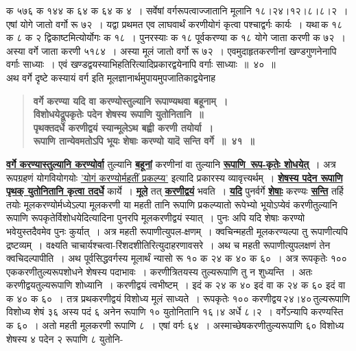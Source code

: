 \documentclass[11pt, openany]{book}
\begin{document}
\newpage

\begin{sloppypar}
\noindent क ५७६ क १४४ क ६४ क ६४ क ४~। सर्वेषां वर्गरूपत्वाज्जातानि मूलानि १८।२४।१२।८।८।२~। एषां योगे जातो वर्गो रू ७२~। यद्वा प्रथमत एव लाघवार्थं करणीयोगं कृत्वा पश्चाद्वर्गः कार्यः~। यथा\textendash \,क १८ क ८ क २ द्विकाष्टमित्योर्योगः क १८~। पुनरस्याः क १८ पूर्वकरण्या क १८ योगे जाता करणी क ७२~। अस्या वर्गे जाता करणी ५१८४~। अस्या मूलं जातो वर्गो रू ७२~। एवमुदाहृतकरणीनां खण्डगुणनेनापि वर्गाः साध्याः~। एवं खण्डद्वयस्याभिहतिरित्यादिप्रकारद्वयेनापि वर्गाः साध्याः~॥~४०~॥ \\

{\small अथ वर्गे दृष्टे कस्यायं वर्ग इति मूलज्ञानार्थमुपायमुपजातिकाद्वयेनाह\textendash }

 \label{4.41}
\begin{quote}
{\large \textbf{{\color{purple}वर्गे करण्या यदि वा करण्योस्तुल्यानि रूपाण्यथवा बहूनाम्~।\\
विशोधयेद्रूपकृतेः पदेन शेषस्य रूपाणि युतोनितानि~॥\\
पृथक्तदर्धे करणीद्वयं स्यान्मूलेऽथ बह्वी करणी तयोर्या~।\\
रूपाणि तान्येवमतोऽपि भूयः शेषाः करण्यो यादॆ सन्ति वर्गे~॥~४१~॥}}}
\end{quote}

\hyperref[4.41]{\textbf{वर्गे करण्यास्तुल्यानि करण्योर्वा}} तुल्यानि \hyperref[4.41]{\textbf{बहूनां}} करणीनां वा तुल्यानि \hyperref[4.41]{\textbf{रूपाणि~रूप-कृतेः शोधयेत्}}~। अत्र रूपग्रहणं योगवियोगयोः \hyperref[4.34]{'योगं करण्योर्महतीं प्रकल्प्य'} इत्यादि प्रकारस्य व्यावृत्त्यर्थम्~। \hyperref[4.41]{\textbf{शेषस्य पदेन रूपाणि पृथक् युतोनितानि कृत्वा तदर्धे}} कार्ये~। \hyperref[4.41]{\textbf{मूले}} तत् \hyperref[4.41]{\textbf{करणीद्वयं}} भवति~। \hyperref[4.41]{\textbf{यदि}} पुनर्वर्गे \hyperref[4.41]{\textbf{शेषाः}} करण्यः \hyperref[4.41]{\textbf{सन्ति}} तर्हि तयोः मूलकरण्योर्मध्येऽल्पा मूलकरणी या महती तानि रूपाणि प्रकल्प्यातो रूपेभ्यो भूयोऽप्येवं करणीतुल्यानि रूपाणि रूपकृतेर्विशोधयेदित्यादिना पुनरपि मूलकरणीद्वयं स्यात्~। पुनः अपि यदि शेषाः करण्यो भवेयुस्तदैवमेव पुनः कुर्यात्~। अत्र महती रूपाणीत्युपल-क्षणम्~। क्वचिन्महती मूलकरण्यल्पा तु रूपाणीत्यपि द्रष्टव्यम्~। वक्ष्यति चाचार्यश्चत्वा-रिंशदशीतिरित्युदाहरणावसरे~। अथ च महती रूपाणीत्युपलक्षणं तेन क्वचिदल्पापीति~। अथ पूर्वसिद्धवर्गस्य मूलार्थं न्यासो रू १० क २४ क ४० क ६०~। अत्र रूपकृतेः १०० एककरणीतुल्यरूपशोधने शेषस्य पदाभावः~। करणीत्रितयस्य तुल्यरूपाणि तु न शुध्यन्ति~। अतः करणीद्वयतुल्यरूपाणि शोध्यानि~। करणीद्वयं त्वभीष्टम्~। इदं क २४ क ४० इदं वा क २४ क ६० इदं वा क ४० क ६०~। तत्र प्रथकरणीद्वयं विशोध्य मूलं साध्यते~। रूपकृतेः १०० करणीद्वय\textendash \,२४।४०\textendash \,तुल्यरूपाणि विशोध्य शेषं ३६ अस्य पदं ६ अनेन रूपाणि १० युतोनितानि १६।४ अर्धे ८।२~। वर्गेऽन्यापि करण्यस्ति क ६०~। अतो महती मूलकरणी रूपाणि ८~। एषां वर्गः ६४~। अस्माच्छेषकरणीतुल्यरूपाणि ६० विशोध्य शेषस्य ४ पदेन २ रूपाणि ८ युतोनि-
\end{sloppypar}
\end{document}
